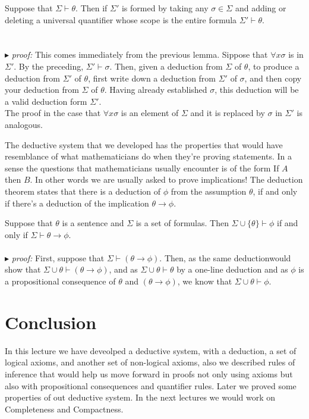 \documentclass[9pt,a4paper]{article}
\newcounter{theo}
\newcommand{\proof}{\ \\ \ \\ $\blacktriangleright$ \textit{proof: }}
\begin{document}
        \begin{lemma}
            Suppose that $\Sigma\vdash\theta$. Then if $\Sigma'$ is formed by taking any $\sigma\in \Sigma$ and adding or deleting a universal quantifier whose scope is the entire formula $\Sigma'\vdash \theta$.\\
            \proof This comes immediately from the previous lemma. Sippose that $\forall x \sigma$ is in $\Sigma'$. By the preceding, $\Sigma'\vdash \sigma$. Then, given a deduction from $\Sigma$ of $\theta$, to produce a deduction from $\Sigma'$ of $\theta$, first write down a deduction from $\Sigma'$ of $\sigma$, and then copy your deduction from $\Sigma$ of $\theta$. Having already established $\sigma$, this deduction will be a valid deduction form $\Sigma'$. \\
            The proof in the case that $\forall x \sigma$ is an element of $\Sigma$ and it is replaced by $\sigma$ in $\Sigma'$ is analogous.
        \end{lemma}
        The deductive system that we developed has the properties that would have resemblance of what mathematicians do when they're proving statements. In a sense the questions that mathematicians usually encounter is of the form If $A$ then $B$. In other words we are usually asked to prove implications! The deduction theorem states that there is a deduction of $\phi$ from the assumption $\theta$, if and only if there's a deduction of the implication $\theta\rightarrow\phi$. 
        \begin{theorem}
            Suppose that $\theta$ is a sentence and $\Sigma$ is a set of formulas. Then $\Sigma \cup\{\theta\}\vdash \phi$ if and only if $\Sigma\vdash \theta\rightarrow\phi$.
            \proof First, suppose that $\Sigma\vdash (\theta\rightarrow\phi)$. Then, as the same deductionwould show that $\Sigma\cup\theta\vdash(\theta\rightarrow\phi)$, and as $\Sigma\cup\theta\vdash \theta$ by a one-line deduction and as $\phi$ is a propositional consequence of $\theta$ and $(\theta\rightarrow\phi)$, we know that $\Sigma\cup\theta\vdash\phi$.
        \end{theorem}
    \section*{Conclusion}
        In this lecture we have deveolped a deductive system, with a deduction, a set of logical axioms, and another set of non-logical axioms, also we described rules of inference that would help us move forward in proofs not only using axioms but also with propositional consequences and quantifier rules. Later we proved some properties of out deductive system. In the next lectures we would work on Completeness and Compactness.
\end{document}
